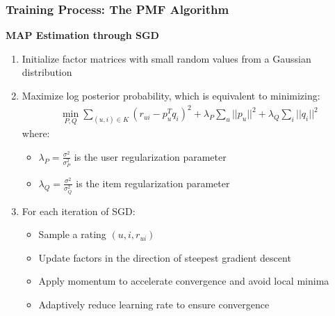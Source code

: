 \documentclass{beamer}
\begin{document}
\begin{frame}
\frametitle{Training Process: The PMF Algorithm}
\textbf{MAP Estimation through SGD}
\begin{enumerate}
    \item Initialize factor matrices with small random values from a Gaussian distribution
    \item Maximize log posterior probability, which is equivalent to minimizing:
    \begin{align*}
    \min_{P,Q} \sum_{(u,i) \in K} (r_{ui} - p_u^T q_i)^2 + \lambda_P \sum_u ||p_u||^2 + \lambda_Q \sum_i ||q_i||^2
    \end{align*}
    where:
    \begin{itemize}
        \item $\lambda_P = \frac{\sigma^2}{\sigma_P^2}$ is the user regularization parameter
        \item $\lambda_Q = \frac{\sigma^2}{\sigma_Q^2}$ is the item regularization parameter
    \end{itemize}
    \item For each iteration of SGD:
    \begin{itemize}
        \item Sample a rating $(u,i,r_{ui})$
        \item Update factors in the direction of steepest gradient descent
        \item Apply momentum to accelerate convergence and avoid local minima
        \item Adaptively reduce learning rate to ensure convergence
    \end{itemize}
\end{enumerate}
\end{frame}
\end{document}
